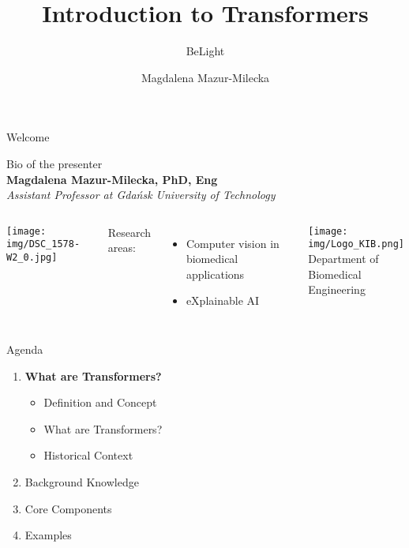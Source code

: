 \documentclass{beamer}
\title[Introduction to Transformers]{Introduction to Transformers}
\subtitle{BeLight}
\author{Magdalena Mazur-Milecka}
\begin{document}
\pgtitleframe

\begin{frame}{Welcome}
\begin{center}
Bio of the presenter\\
\textbf{Magdalena Mazur-Milecka, PhD, Eng}\\
\textit{Assistant Professor at Gdańsk University of Technology} \\
\end{center}

\begin{columns}
            \begin{center}
       
 \texttt{[image: img/DSC\_1578-W2\_0.jpg]} \\

            \end{center}
           
            Research areas:
            \begin{itemize}
            \item Computer vision in biomedical applications
            \item eXplainable AI 
            \end{itemize}
           \begin{center}
            \texttt{[image: img/Logo\_KIB.png]} \\
             Department of Biomedical Engineering 
           \end{center}
            \bigskip
            
       
    \end{columns}
\end{frame}

\begin{frame}{Agenda}

\begin{enumerate}
 \item \textbf{What are Transformers?}
 \begin{itemize}
    \item Definition and Concept
    
        \item What are Transformers?
        

    \item Historical Context
\end{itemize}
\item Background Knowledge
\item Core Components
\item Examples
\end{enumerate}

\end{frame}
\end{document}
